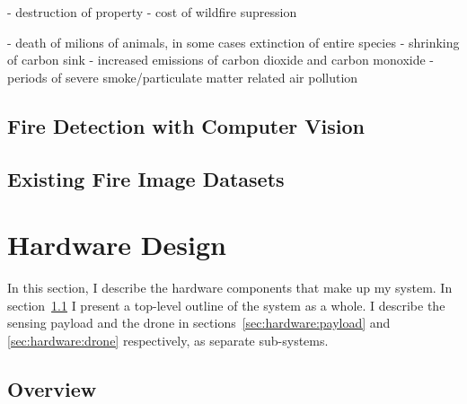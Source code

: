   - destruction of property
  - cost of wildfire supression

  - death of milions of animals, in some cases extinction of entire species\cite{}
  - shrinking of carbon sink
  - increased emissions of carbon dioxide and carbon monoxide %
  - periods of severe smoke/particulate matter related air pollution



  


  \subsection{Fire Detection with Computer Vision}

  \subsection{Existing Fire Image Datasets}

\section{Hardware Design}\label{sec:hardware}

  In this section, I describe the hardware components that make up my system.
  In section~\ref{sec:hardware:overview} I present a top-level outline of the system as a whole.
  I describe the sensing payload and the drone in sections~\ref{sec:hardware:payload} and \ref{sec:hardware:drone} respectively, as separate sub-systems.

  \subsection{Overview}\label{sec:hardware:overview}

